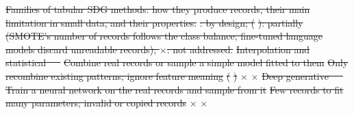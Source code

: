 \documentclass[conference]{IEEEtran}
\providecommand{\DIFdeltex}[1]{{\protect\color{red}\sout{#1}}}                      %
\providecommand{\DIFdelbegin}{} %
\providecommand{\DIFdelFL}[1]{\DIFdel{#1}} %
\providecommand{\DIFdel}[1]{\texorpdfstring{\DIFdeltex{#1}}{}} %
\newcommand{\DIFscaledelfig}{0.5}
\newlength{\DIFdelgraphicswidth} %
\newlength{\DIFdelgraphicsheight} %
\newcommand{\DIFdelincludegraphics}[2][]{%
\sbox{\DIFdelgraphicsbox}{\DIFOincludegraphics[#1]{#2}}%
\settoboxwidth{\DIFdelgraphicswidth}{\DIFdelgraphicsbox} %
\settoboxtotalheight{\DIFdelgraphicsheight}{\DIFdelgraphicsbox} %
\scalebox{\DIFscaledelfig}{%
\parbox[b]{\DIFdelgraphicswidth}{\usebox{\DIFdelgraphicsbox}\\[-\baselineskip] \rule{\DIFdelgraphicswidth}{0em}}\llap{\resizebox{\DIFdelgraphicswidth}{\DIFdelgraphicsheight}{%
\setlength{\unitlength}{\DIFdelgraphicswidth}%
\begin{picture}(1,1)%
\thicklines\linethickness{2pt} %
{\color[rgb]{1,0,0}\put(0,0){\framebox(1,1){}}}%
{\color[rgb]{1,0,0}\put(0,0){\line( 1,1){1}}}%
{\color[rgb]{1,0,0}\put(0,1){\line(1,-1){1}}}%
\end{picture}%
}\hspace*{3pt}}} %
} %
\DeclareRobustCommand{\DIFdelbegin}{\DIFOdelbegin \let\includegraphics\DIFdelincludegraphics} %
\begin{document}
\DIFdelbegin %
{%
\DIFdelFL{Families of tabular SDG methods: how they produce records, their main limitation in small data, and their properties. }%
\DIFdelFL{: by design; (}%
\DIFdelFL{): partially (SMOTE's number of records follows the class balance; fine-tuned language models discard unreadable records); $\times$: not addressed.}}
\DIFdelFL{Interpolation and statistical~\mbox{%
\cite{chawla2002smote,zhang2014privbayes} }\hskip0pt%
}%
\DIFdelFL{Combine real records or sample a simple model fitted to them }%
\DIFdelFL{Only recombine existing patterns; ignore feature meaning }%
\DIFdelFL{(}%
\DIFdelFL{) }%
\DIFdelFL{$\times$ }%
\DIFdelFL{$\times$ }%
\DIFdelFL{Deep generative~\mbox{%
\cite{xu2019ctgan,kotelnikov2023tabddpm,zhang2024tabsyn} }\hskip0pt%
}%
\DIFdelFL{Train a neural network on the real records and sample from it }%
\DIFdelFL{Few records to fit many parameters; invalid or copied records }%
\DIFdelFL{$\times$ }%
\DIFdelFL{$\times$ }%
\end{document}
